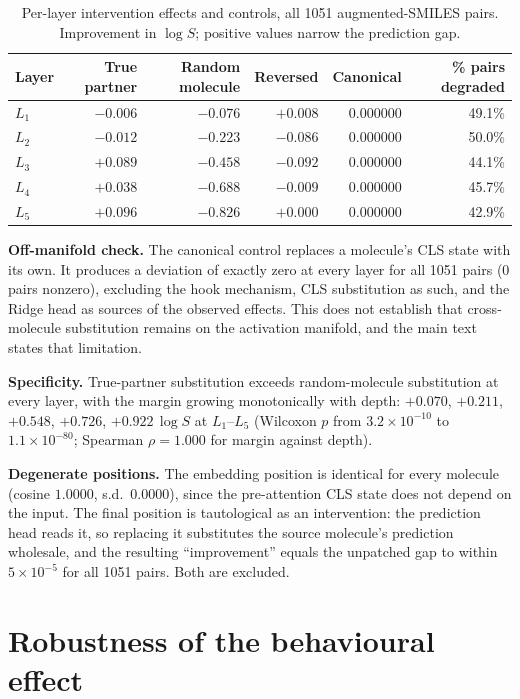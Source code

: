 \documentclass[11pt,a4paper]{article}
\newcommand{\logS}{\ensuremath{\log S}}
\begin{document}
\begin{table}[h]
\centering
\caption{Per-layer intervention effects and controls, all 1051 augmented-SMILES pairs.
Improvement in $\logS$; positive values narrow the prediction gap.}
\label{tab:layers}
\small
\begin{tabular}{lrrrrr}
\toprule
Layer & True partner & Random molecule & Reversed & Canonical & \% pairs degraded \\
\midrule
$L_1$ & $-0.006$ & $-0.076$ & $+0.008$ & $0.000000$ & 49.1\% \\
$L_2$ & $-0.012$ & $-0.223$ & $-0.086$ & $0.000000$ & 50.0\% \\
$L_3$ & $+0.089$ & $-0.458$ & $-0.092$ & $0.000000$ & 44.1\% \\
$L_4$ & $+0.038$ & $-0.688$ & $-0.009$ & $0.000000$ & 45.7\% \\
$L_5$ & $+0.096$ & $-0.826$ & $+0.000$ & $0.000000$ & 42.9\% \\
\bottomrule
\end{tabular}
\end{table}

\noindent \textbf{Off-manifold check.} The canonical control replaces a molecule's CLS state with its
own. It produces a deviation of exactly zero at every layer for all 1051 pairs (0 pairs nonzero),
excluding the hook mechanism, CLS substitution as such, and the Ridge head as sources of the observed
effects. This does not establish that cross-molecule substitution remains on the activation manifold,
and the main text states that limitation.

\noindent \textbf{Specificity.} True-partner substitution exceeds random-molecule substitution at
every layer, with the margin growing monotonically with depth: $+0.070$, $+0.211$, $+0.548$, $+0.726$,
$+0.922\,\logS$ at $L_1$--$L_5$ (Wilcoxon $p$ from $3.2\times10^{-10}$ to $1.1\times10^{-80}$;
Spearman $\rho = 1.000$ for margin against depth).

\noindent \textbf{Degenerate positions.} The embedding position is identical for every molecule
(cosine $1.0000$, s.d.\ $0.0000$), since the pre-attention CLS state does not depend on the input.
The final position is tautological as an intervention: the prediction head reads it, so replacing it
substitutes the source molecule's prediction wholesale, and the resulting ``improvement'' equals the
unpatched gap to within $5\times10^{-5}$ for all 1051 pairs. Both are excluded.

\section{Robustness of the behavioural effect}
\end{document}
